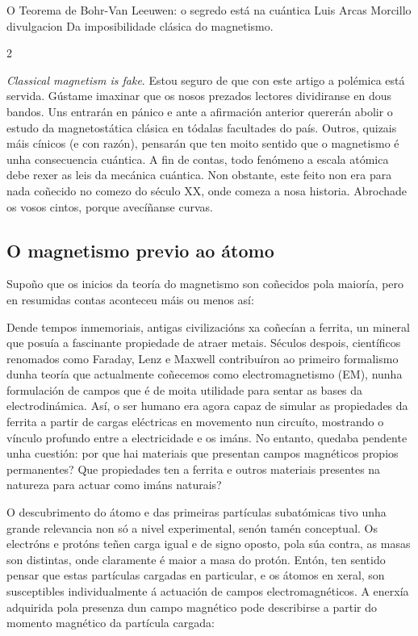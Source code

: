 \Titular%
{O Teorema de Bohr-Van Leeuwen: o segredo está na cuántica}%
{Luis Arcas Morcillo}%
{divulgacion}%
{Da imposibilidade clásica do magnetismo.}%


\begin{refsection}
\begin{multicols}{2}


\textit{Classical magnetism is fake}. Estou seguro de que con este artigo a
polémica está servida. Gústame imaxinar que os nosos prezados lectores
dividiranse en dous bandos. Uns entrarán en pánico e ante a afirmación anterior
quererán abolir o estudo da magnetostática clásica en tódalas facultades do
país. Outros, quizais máis cínicos (e con razón), pensarán que ten moito
sentido que o magnetismo é unha consecuencia cuántica. A fin de contas, todo
fenómeno a escala atómica debe rexer as leis da mecánica cuántica. Non
obstante, este feito non era para nada coñecido no comezo do século XX, onde
comeza a nosa historia. Abrochade os vosos cintos, porque avecíñanse curvas.

\subsection*{O magnetismo previo ao átomo}

Supoño que os inicios da teoría do magnetismo son coñecidos pola maioría, pero
en resumidas contas aconteceu máis ou menos así:

Dende tempos inmemoriais, antigas civilizacións xa coñecían a ferrita, un
mineral que posuía a fascinante propiedade de atraer metais. Séculos despois,
científicos renomados como Faraday, Lenz e Maxwell contribuíron ao primeiro
formalismo dunha teoría que actualmente coñecemos como electromagnetismo (EM),
nunha formulación de campos que é de moita utilidade para sentar as bases da
electrodinámica. Así, o ser humano era agora capaz de simular as propiedades da
ferrita a partir de cargas eléctricas en movemento nun circuíto, mostrando o
vínculo profundo entre a electricidade e os imáns. No entanto, quedaba pendente
unha cuestión: por que hai materiais que presentan campos magnéticos propios
permanentes? Que propiedades ten a ferrita e outros materiais presentes na
natureza para actuar como imáns naturais?

O descubrimento do átomo e das primeiras partículas subatómicas tivo unha
grande relevancia non só a nivel experimental, senón tamén conceptual. Os
electróns e protóns teñen carga igual e de signo oposto, pola súa contra, as
masas son distintas, onde claramente é maior a masa do protón. Entón, ten
sentido pensar que estas partículas cargadas en particular, e os átomos en
xeral, son susceptibles individualmente á actuación de campos
electromagnéticos. A enerxía adquirida pola presenza dun campo magnético pode
describirse a partir do momento magnético da partícula cargada:


\end{multicols}
\end{refsection}
